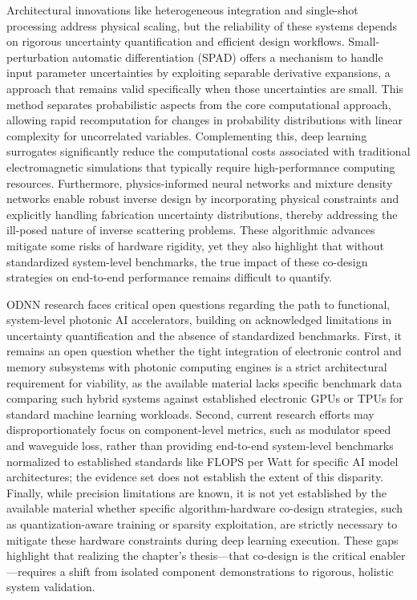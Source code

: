\documentclass[11pt]{article}
\begin{document}
Architectural innovations like heterogeneous integration and single-shot processing address physical scaling, but the reliability of these systems depends on rigorous uncertainty quantification and efficient design workflows. Small-perturbation automatic differentiation (SPAD) offers a mechanism to handle input parameter uncertainties by exploiting separable derivative expansions, a approach that remains valid specifically when those uncertainties are small. This method separates probabilistic aspects from the core computational approach, allowing rapid recomputation for changes in probability distributions with linear complexity for uncorrelated variables. Complementing this, deep learning surrogates significantly reduce the computational costs associated with traditional electromagnetic simulations that typically require high-performance computing resources. Furthermore, physics-informed neural networks and mixture density networks enable robust inverse design by incorporating physical constraints and explicitly handling fabrication uncertainty distributions, thereby addressing the ill-posed nature of inverse scattering problems. These algorithmic advances mitigate some risks of hardware rigidity, yet they also highlight that without standardized system-level benchmarks, the true impact of these co-design strategies on end-to-end performance remains difficult to quantify. \citep{s2_964fe0d656467421d5df282abd0e0a2aca877e7e_399e029e} \citep{doi_10_1109_sbfotoniopc62248_2024_10813471_692f0088} \citep{s2_037e66f37189104d61c0d000de0cee202b7eec9e_d15b8018}

ODNN research faces critical open questions regarding the path to functional, system-level photonic AI accelerators, building on acknowledged limitations in uncertainty quantification and the absence of standardized benchmarks. First, it remains an open question whether the tight integration of electronic control and memory subsystems with photonic computing engines is a strict architectural requirement for viability, as the available material lacks specific benchmark data comparing such hybrid systems against established electronic GPUs or TPUs for standard machine learning workloads. Second, current research efforts may disproportionately focus on component-level metrics, such as modulator speed and waveguide loss, rather than providing end-to-end system-level benchmarks normalized to established standards like FLOPS per Watt for specific AI model architectures; the evidence set does not establish the extent of this disparity. Finally, while precision limitations are known, it is not yet established by the available material whether specific algorithm-hardware co-design strategies, such as quantization-aware training or sparsity exploitation, are strictly necessary to mitigate these hardware constraints during deep learning execution. These gaps highlight that realizing the chapter's thesis---that co-design is the critical enabler---requires a shift from isolated component demonstrations to rigorous, holistic system validation.
\end{document}
